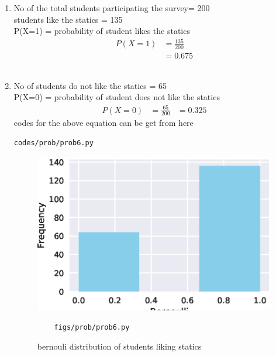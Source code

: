 \renewcommand{\theequation}{\theenumi}
\begin{enumerate}[label=\arabic*.,ref=\thesubsection.\theenumi]
\item No of the total students participating the survey=
200
\\
students like the statics = 135
\\
P(X=1) = probability of student likes the statics
\begin{align}
P\left(X=1\right) &= \frac{135}{200}
\\
&= 0.675
\end{align}
\\
\item No of students do not like the statics = 65
\\
P(X=0) = probability of student does not like the statics
\begin{align}
P\left(X=0\right) &= \frac{65}{200}
&= 0.325
\end{align} 
codes for the above equation can be get from here
\begin{lstlisting}
codes/prob/prob6.py
\end{lstlisting}
\begin{figure}[!ht]
	\centering
	\includegraphics[width=\columnwidth]{./figures/prob/prob6.eps}
	\caption{bernouli distribution of students liking statics }
	\label{fig:bt5}
	\begin{lstlisting}
	figs/prob/prob6.py
	\end{lstlisting}
\end{figure}
\end{enumerate}